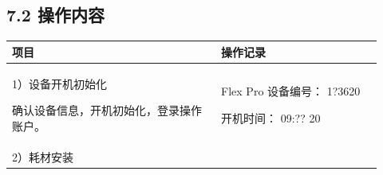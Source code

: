 \documentclass[UTF8,10pt,a4paper,fontset=fandol]{ctexart}
\newcommand{\fieldvalue}[1]{#1}
\newcommand{\handwritten}[1]{#1}
\begin{document}
\subsection*{7.2 操作内容}

\begin{tabular}{|p{0.52\linewidth}|p{0.40\linewidth}|}
\hline
项目 & 操作记录 \\
\hline
1）设备开机初始化

确认设备信息，开机初始化，登录操作账户。 &
Flex Pro 设备编号：%
\fieldvalue{\handwritten{1?3620}}

开机时间：%
\fieldvalue{\handwritten{09:?? 20}} \\
\hline
2）耗材安装


\end{tabular}
\end{document}

